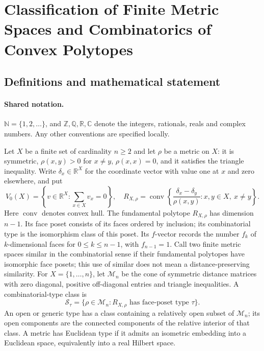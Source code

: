 \documentclass[11pt]{article}
\begin{document}
\section{Classification of Finite Metric Spaces and Combinatorics of Convex Polytopes}\label{statement}

\subsection{Definitions and mathematical statement}

\paragraph{Shared notation.}$\mathbb N=\{1,2,\ldots\}$, and $\mathbb Z,\mathbb Q,\mathbb R,\mathbb C$ denote the integers, rationals, reals and complex numbers. Any other conventions are specified locally.


Let \(X\) be a finite set of cardinality \(n\ge2\) and let \(\rho\) be a metric on \(X\): it is symmetric, \(\rho(x,y)>0\) for \(x\ne y\), \(\rho(x,x)=0\), and it satisfies the triangle inequality. Write \(\delta_x\in\mathbb R^X\) for the coordinate vector with value one at \(x\) and zero elsewhere, and put
\[V_0(X)=\left\{v\in\mathbb R^X:\sum_{x\in X}v_x=0\right\},\quad
R_{X,\rho}=\operatorname{conv}\left\{\frac{\delta_x-\delta_y}{\rho(x,y)}:x,y\in X,\ x\ne y\right\}.\]
Here \(\operatorname{conv}\) denotes convex hull. The fundamental polytope \(R_{X,\rho}\) has dimension \(n-1\). Its face poset consists of its faces ordered by inclusion; its combinatorial type is the isomorphism class of this poset. Its \(f\)-vector records the number \(f_k\) of \(k\)-dimensional faces for \(0\le k\le n-1\), with \(f_{n-1}=1\). Call two finite metric spaces similar in the combinatorial sense if their fundamental polytopes have isomorphic face posets; this use of similar does not mean a distance-preserving similarity.
For \(X=\{1,\ldots,n\}\), let \(\mathcal M_n\) be the cone of symmetric distance matrices with zero diagonal, positive off-diagonal entries and triangle inequalities. A combinatorial-type class is
\[\mathcal S_\tau=\{\rho\in\mathcal M_n:R_{X,\rho}\text{ has face-poset type }\tau\}.\]
An open or generic type has a class containing a relatively open subset of \(\mathcal M_n\); its open components are the connected components of the relative interior of that class. A metric has Euclidean type if it admits an isometric embedding into a Euclidean space, equivalently into a real Hilbert space.
\end{document}

